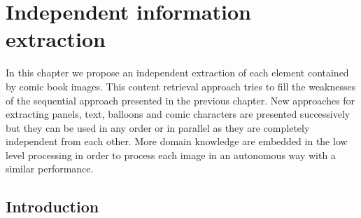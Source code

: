 \chapter{Independent information extraction}
\label{chap:independent}
\graphicspath{{./chapters/4-independent/figs/}}


In this chapter we propose an independent extraction of each element contained by comic book images.
This content retrieval approach tries to fill the weaknesses of the sequential approach presented in the previous chapter.
New approaches for extracting panels, text, balloons and comic characters are presented successively but they can be used in any order or in parallel as they are completely independent from each other.
More domain knowledge are embedded in the low level processing in order to process each image in an autonomous way with a similar performance.


\section{Introduction}
\label{sec:in:intro}

